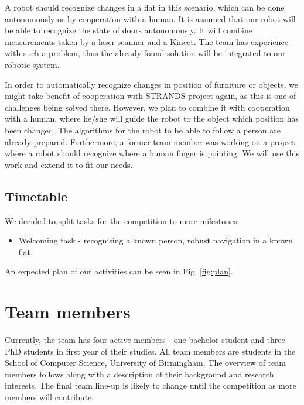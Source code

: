 \documentclass[conference]{IEEEtran}
\begin{document}
A robot should recognize changes in a flat in this scenario, which can be done autonomously or by cooperation with a human. It is assumed that our robot will be able to recognize the state of doors autonomously. It will combine measurements taken by a laser scanner and a Kinect. The team has experience with such a problem, thus the already found solution will be integrated to our robotic system. 

In order to automatically recognize changes in position of furniture or objects, we might take benefit of cooperation with STRANDS project again, as this is one of challenges being solved there. However, we plan to combine it with cooperation with a human, where he/she will guide the robot to the object which position has been changed. The algorithms for the robot to be able to follow a person are already prepared. Furthermore, a former team member was working on a project where a robot should recognize where a human finger is pointing. We will use this work and extend it to fit our needs.

\subsection{Timetable}
We decided to split tasks for the competition to more milestones:
\begin{itemize}
\item Welcoming task - recognising a known person, robust navigation in a known flat. 
\end{itemize}
An expected plan of our activities can be seen in Fig. \ref{fig:plan}.


\section{Team members}
Currently, the team has four active members - one bachelor student and three PhD students in first year of their studies. All team members are students in the School of Computer Science, University of Birmingham. The overview of team members follows along with a description of their background and research interests. The final team line-up is likely to change until the competition as more members will contribute.
\end{document}
